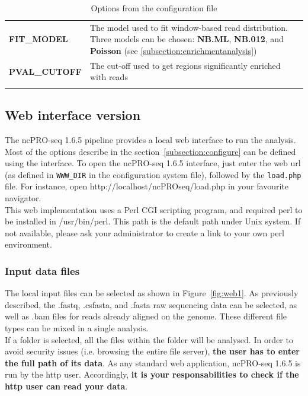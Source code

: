 \documentclass[12pt]{article}
\def \ncpip{ncPRO-seq 1.6.5}
\begin{document}
\begin{center}
\begin{longtable}{|p{8cm}|p{8cm}|}
\textbf{FIT\_MODEL} & The model used to fit window-based read distribution. Three models can be chosen: \textbf{NB.ML}, \textbf{NB.012}, and \textbf{Poisson} (see \ref{subsection:enrichmentanalysis})\\
\textbf{PVAL\_CUTOFF} & The cut-off used to get regions significantly enriched with reads\\
\hline
\caption{Options from the configuration file}
\label{tab:configureoptions}
\end{longtable}
\end{center}

\subsection{Web interface version}
\label{subsection:webinterface}
The \ncpip{} pipeline provides a local web interface to run the analysis. Most of the options describe in the section~\ref{subsection:configure} can be defined using the interface. To open the \ncpip{} interface, just enter the web url (as defined in \verb+WWW_DIR+ in the configuration system file), followed by the \verb+load.php+ file. For instance, open http://localhost/ncPROseq/load.php in your favourite navigator.\\
This web implementation uses a Perl CGI scripting program, and required perl to be installed in /usr/bin/perl. This path is the default path under Unix system. If not available, please ask your administrator to create a link to your own perl environment.

\subsubsection{Input data files}
The local input files can be selected as shown in Figure~\ref{fig:web1}. As previously described, the .fastq, .csfasta, and .fasta raw sequencing data can be selected, as well as .bam files for reads already aligned on the genome. These different file types can be mixed in a single analysis.\\
If a folder is selected, all the files within the folder will be analysed.
In order to avoid security issues (i.e. browsing the entire file server), \textbf{the user has to enter the full path of its data}.
As any standard web application, \ncpip{} is run by the http user. Accordingly, \textbf{it is your responsabilities to check if the http user can read your data}.
\end{document}
